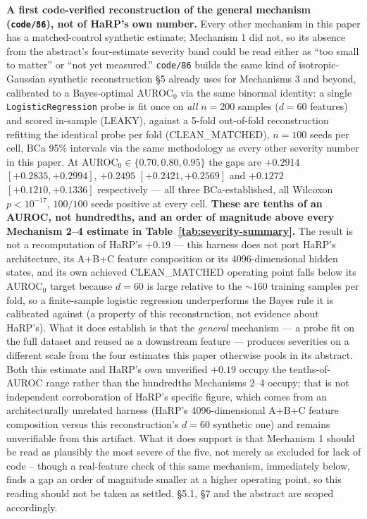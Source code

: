 \documentclass[10pt]{article} %
\begin{document}
\textbf{A first code-verified reconstruction of the general mechanism
(\texttt{code/86}), not of HaRP's own number.} Every other mechanism in this
paper has a matched-control synthetic estimate; Mechanism 1 did not, so its
absence from the abstract's four-estimate severity band could be read either
as ``too small to matter'' or ``not yet measured.'' \texttt{code/86} builds the
same kind of isotropic-Gaussian synthetic reconstruction §5 already uses for
Mechanisms 3 and beyond, calibrated to a Bayes-optimal AUROC$_0$ via the same
binormal identity: a single \texttt{LogisticRegression} probe is fit once on
\emph{all} $n=200$ samples ($d=60$ features) and scored in-sample (LEAKY),
against a 5-fold out-of-fold reconstruction refitting the identical probe per
fold (CLEAN\_MATCHED), $n=100$ seeds per cell, BCa 95\% intervals via the same
methodology as every other severity number in this paper. At AUROC$_0\in
\{0.70,0.80,0.95\}$ the gaps are $+0.2914$ $[+0.2835,+0.2994]$, $+0.2495$
$[+0.2421,+0.2569]$ and $+0.1272$ $[+0.1210,+0.1336]$ respectively --- all
three BCa-established, all Wilcoxon $p<10^{-17}$, $100/100$ seeds positive at
every cell. \textbf{These are tenths of an AUROC, not hundredths, and an order
of magnitude above every Mechanism 2--4 estimate in Table~\ref{tab:severity-summary}.}
The result is not a recomputation of HaRP's $+0.19$ --- this harness does not
port HaRP's architecture, its A+B+C feature composition or its 4096-dimensional
hidden states, and its own achieved CLEAN\_MATCHED operating point falls below
its AUROC$_0$ target because $d=60$ is large relative to the $\sim160$
training samples per fold, so a finite-sample logistic regression underperforms
the Bayes rule it is calibrated against (a property of this reconstruction, not
evidence about HaRP's). What it does establish is that the \emph{general}
mechanism --- a probe fit on the full dataset and reused as a downstream
feature --- produces severities on a different scale from the four estimates
this paper otherwise pools in its abstract. Both this estimate and HaRP's own
unverified $+0.19$ occupy the tenths-of-AUROC range rather than the
hundredths Mechanisms 2--4 occupy; that is not independent corroboration of
HaRP's specific figure, which comes from an architecturally unrelated harness
(HaRP's 4096-dimensional A+B+C feature composition versus this
reconstruction's $d=60$ synthetic one) and remains unverifiable from this
artifact. What it does support is that Mechanism 1 should be read as
plausibly the most severe of the five, not merely as excluded for lack of
code -- though a real-feature check of this same mechanism, immediately
below, finds a gap an order of magnitude smaller at a higher operating
point, so this reading should not be taken as settled. §5.1, §7 and the
abstract are scoped accordingly.
\end{document}
